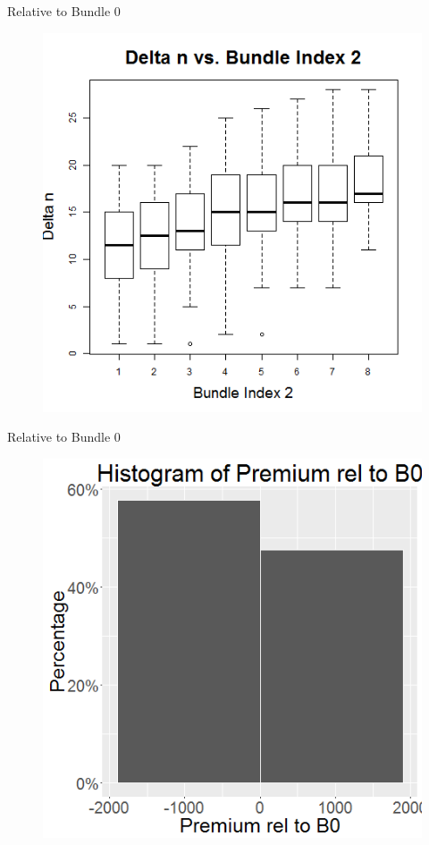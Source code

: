 \documentclass[xcolor=dvipsnames,12pt]{beamer}
\theoremstyle{definition}
\begin{document}
\begin{frame}{Relative to Bundle 0}
\begin{figure}
\graphicspath{ {../../0_relative_to_bundle_0/} }
\includegraphics[scale=0.43]{2_boxplot_delta_n_bundle_index_rel_to_b0}
\end{figure}
\end{frame}

\begin{frame}{Relative to Bundle 0}
\begin{figure}
\graphicspath{ {../../0_relative_to_bundle_0/} }
\includegraphics[scale=0.43]{3_histogram_of_prem_rel_to_b0_2_col}
\end{figure}
\end{frame}
\end{document}
